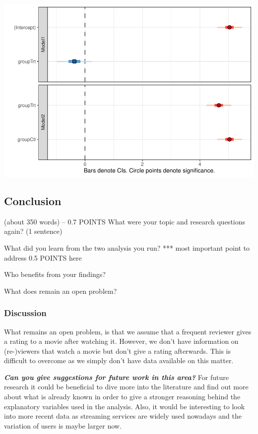 \documentclass[
  man]{apa6}
\begin{document}
\includegraphics{SNA4DSprojectReport_files/figure-latex/model 4-1.pdf}

\hypertarget{conclusion}{%
\subsection{Conclusion}\label{conclusion}}

(about 350 words) -- 0.7 POINTS What were your topic and research
questions again? (1 sentence)

What did you learn from the two analysis you run? *** most important
point to address 0.5 POINTS here

Who benefits from your findings?

What does remain an open problem?

\hypertarget{discussion}{%
\subsubsection{Discussion}\label{discussion}}

What remains an open problem, is that we assume that a frequent reviewer
gives a rating to a movie after watching it. However, we don't have
information on (re-)viewers that watch a movie but don't give a rating
afterwards. This is difficult to overcome as we simply don't have data
available on this matter.

\textbf{\emph{Can you give suggestions for future work in this area?}}
For future research it could be beneficial to dive more into the
literature and find out more about what is already known in order to
give a stronger reasoning behind the explanatory variables used in the
analysis. Also, it would be interesting to look into more recent data as
streaming services are widely used nowadays and the variation of users
is maybe larger now.
\end{document}
